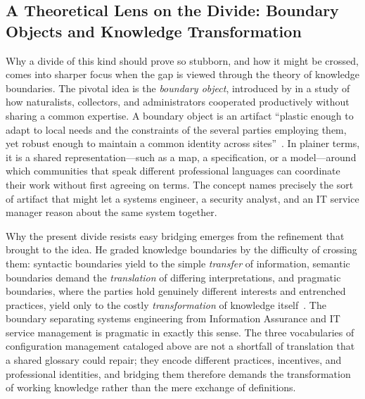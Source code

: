 \subsection{A Theoretical Lens on the Divide: Boundary Objects and Knowledge Transformation}

Why a divide of this kind should prove so stubborn, and how it might be crossed, comes into sharper focus when the gap is viewed through the theory of knowledge boundaries. The pivotal idea is the \emph{boundary object}, introduced by \citeauthor{Star_Griesemer_1989} in a study of how naturalists, collectors, and administrators cooperated productively without sharing a common expertise. A boundary object is an artifact ``plastic enough to adapt to local needs and the constraints of the several parties employing them, yet robust enough to maintain a common identity across sites''~\parencite{Star_Griesemer_1989}. In plainer terms, it is a shared representation---such as a map, a specification, or a model---around which communities that speak different professional languages can coordinate their work without first agreeing on terms. The concept names precisely the sort of artifact that might let a systems engineer, a security analyst, and an IT service manager reason about the same system together.

Why the present divide resists easy bridging emerges from the refinement that \citeauthor{Carlile_2004} brought to the idea. He graded knowledge boundaries by the difficulty of crossing them: syntactic boundaries yield to the simple \emph{transfer} of information, semantic boundaries demand the \emph{translation} of differing interpretations, and pragmatic boundaries, where the parties hold genuinely different interests and entrenched practices, yield only to the costly \emph{transformation} of knowledge itself~\parencite{Carlile_2002, Carlile_2004}. The boundary separating systems engineering from Information Assurance and IT service management is pragmatic in exactly this sense. The three vocabularies of configuration management cataloged above are not a shortfall of translation that a shared glossary could repair; they encode different practices, incentives, and professional identities, and bridging them therefore demands the transformation of working knowledge rather than the mere exchange of definitions.

